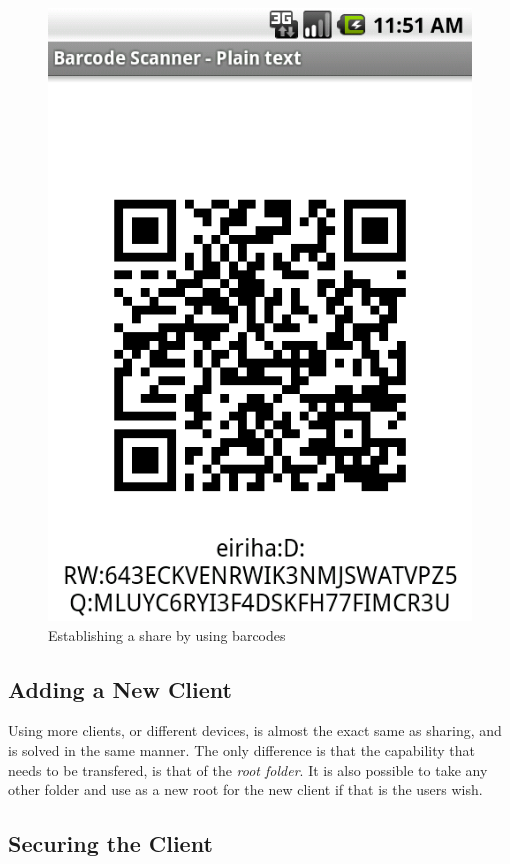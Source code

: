 \documentclass[pdftex,english,10pt,b5paper,twoside]{book}
\begin{document}
\begin{figure}[h!]
    \centering
    \includegraphics[scale=0.4]{client-barcode.png}
    \caption{Establishing a share by using barcodes}
    \label{fig:CSVAndroid:barcode}
\end{figure}

\subsection{Adding a New Client}

Using more clients, or different devices, is almost the exact same as sharing,
and is solved in the same manner. The only difference is that the capability
that needs to be transfered, is that of the \emph{root folder}. It is also
possible to take any other folder and use as a new root for the new client if
that is the users wish.

\subsection{Securing the Client}
\end{document}
